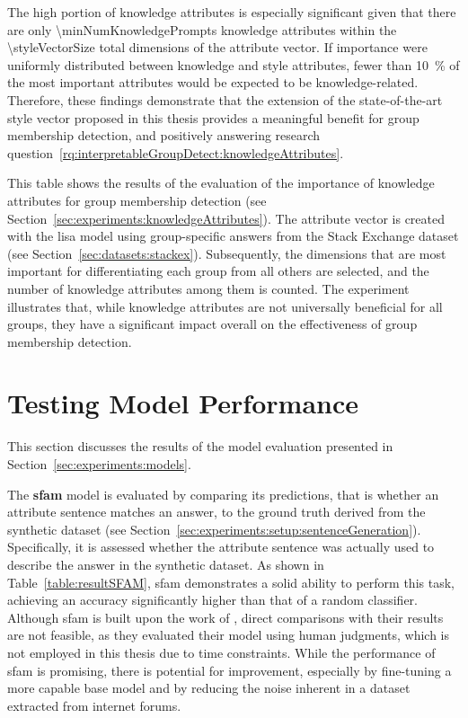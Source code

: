 The high portion of knowledge attributes is especially significant given that there are only \num{\minNumKnowledgePrompts} knowledge attributes within the \num{\styleVectorSize} total dimensions of the attribute vector. If importance were uniformly distributed between knowledge and style attributes, fewer than \SI{10}{\percent} of the most important attributes would be expected to be knowledge-related. Therefore, these findings demonstrate that the extension of the state-of-the-art style vector proposed in this thesis provides a meaningful benefit for group membership detection, and positively answering research question~\ref{rq:interpretableGroupDetect:knowledgeAttributes}.

\begin{table}[ht]
  \caption[]{This table shows the results of the evaluation of the importance of knowledge attributes for group membership detection (see Section~\ref{sec:experiments:knowledgeAttributes}). The attribute vector is created with the \ac{lisa} model using group-specific answers from the Stack Exchange dataset (see Section~\ref{sec:datasets:stackex}). Subsequently, the dimensions that are most important for differentiating each group from all others are selected, and the number of knowledge attributes among them is counted. The experiment illustrates that, while knowledge attributes are not universally beneficial for all groups, they have a significant impact overall on the effectiveness of group membership detection.}
  \resultKnowledgeImportance{}%
  \label{table:knowledgeImportance}
\end{table}

\section{Testing Model Performance}%
\label{sec:evaluation:models}

This section discusses the results of the model evaluation presented in Section~\ref{sec:experiments:models}.

The \textbf{\acs{sfam}} model is evaluated by comparing its predictions, that is whether an attribute sentence matches an answer, to the ground truth derived from the synthetic dataset (see Section~\ref{sec:experiments:setup:sentenceGeneration}). Specifically, it is assessed whether the attribute sentence was actually used to describe the answer in the synthetic dataset. As shown in Table~\ref{table:resultSFAM}, \ac{sfam} demonstrates a solid ability to perform this task, achieving an accuracy significantly higher than that of a random classifier. Although \ac{sfam} is built upon the work of \citet{patelLearningInterpretableStyle2023}, direct comparisons with their results are not feasible, as they evaluated their model using human judgments, which is not employed in this thesis due to time constraints. While the performance of \ac{sfam} is promising, there is potential for improvement, especially by fine-tuning a more capable base model and by reducing the noise inherent in a dataset extracted from internet forums.

